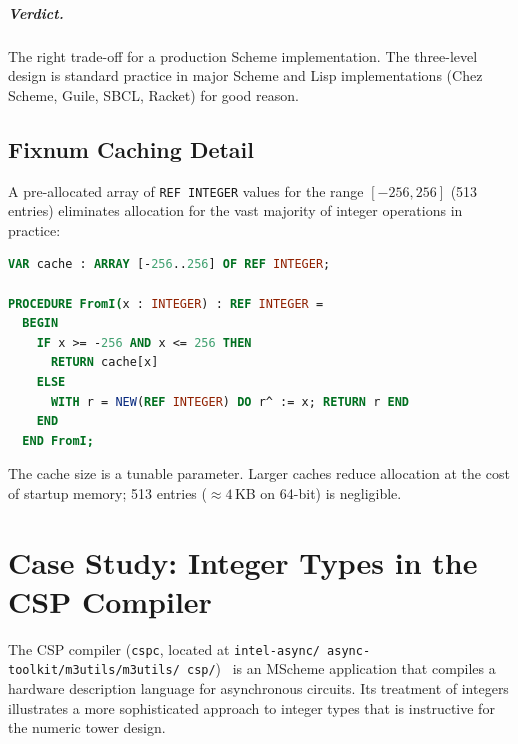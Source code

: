 \documentclass[12pt]{report}
\begin{document}
\paragraph{Verdict.}
The right trade-off for a production Scheme implementation.  The
three-level design is standard practice in major Scheme and Lisp
implementations (Chez Scheme, Guile, SBCL, Racket) for good reason.

\section{Fixnum Caching Detail}

A pre-allocated array of {\tt REF INTEGER} values for the range
$[-256, 256]$ (513 entries) eliminates allocation for the vast
majority of integer operations in practice:

\begin{lstlisting}[language=Modula3]
VAR cache : ARRAY [-256..256] OF REF INTEGER;

PROCEDURE FromI(x : INTEGER) : REF INTEGER =
  BEGIN
    IF x >= -256 AND x <= 256 THEN
      RETURN cache[x]
    ELSE
      WITH r = NEW(REF INTEGER) DO r^ := x; RETURN r END
    END
  END FromI;
\end{lstlisting}

\noindent The cache size is a tunable parameter.  Larger caches
reduce allocation at the cost of startup memory; 513 entries
($\approx 4$\,KB on 64-bit) is negligible.

\chapter{Case Study: Integer Types in the CSP Compiler}
\label{ch:csp}

The CSP compiler ({\tt cspc}, located at {\tt intel-async/\allowbreak
async-toolkit/\allowbreak m3utils/\allowbreak m3utils/\allowbreak
csp/})~\cite{cspmanual} is an MScheme application that compiles a
hardware description language for asynchronous circuits.  Its
treatment of integers illustrates a more sophisticated approach
to integer types that is instructive for the numeric tower design.

\end{document}
